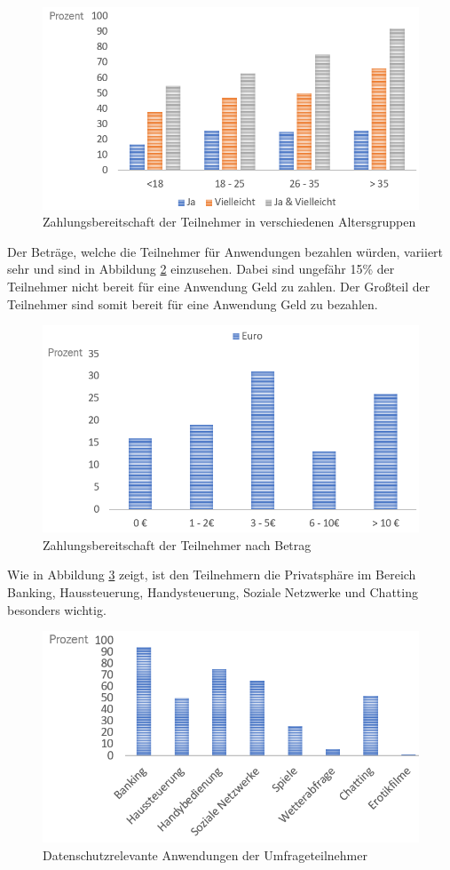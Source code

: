\begin{figure}[h!]
	\centering
	\includegraphics[width=0.7\linewidth]{Picture/umfrage_geld_gruppen}
	\caption[Zahlungsbereitschaft der Teilnehmer in verschiedenen Altersgruppen]{Zahlungsbereitschaft der Teilnehmer in verschiedenen Altersgruppen}
	\label{fig:umfrage_geld_gruppen}
\end{figure}

Der Beträge, welche die Teilnehmer für Anwendungen bezahlen würden, variiert sehr und sind in Abbildung \ref{fig:umfrage_betrag} einzusehen. Dabei sind ungefähr 15\% der Teilnehmer nicht bereit für eine Anwendung Geld zu zahlen. Der Großteil der Teilnehmer sind somit bereit für eine Anwendung Geld zu bezahlen.

\begin{figure}[h!]
	\centering
	\includegraphics[width=0.7\linewidth]{Picture/umfrage_betrag}
	\caption[Zahlungsbereitschaft der Teilnehmer nach Betrag]{Zahlungsbereitschaft der Teilnehmer nach Betrag}
	\label{fig:umfrage_betrag}
\end{figure}

Wie in Abbildung \ref{fig:umfrage_anwendung} zeigt, ist den Teilnehmern die Privatsphäre im Bereich Banking, Haussteuerung, Handysteuerung, Soziale Netzwerke und Chatting besonders wichtig.

\begin{figure}[h!]
	\centering
	\includegraphics[width=0.7\linewidth]{Picture/umfrage_anwendung}
	\caption[Datenschutzrelevante Anwendungen der Umfrageteilnehmers]{Datenschutzrelevante Anwendungen der Umfrageteilnehmer}
	\label{fig:umfrage_anwendung}
\end{figure}

